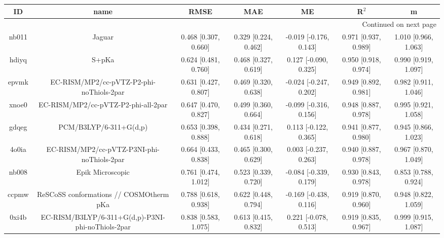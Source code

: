 \documentclass{article}
\begin{document}
\begin{center}
\begin{longtable}{|ccccccc|}
\toprule
    ID &                                               name &                  RMSE &                   MAE &                       ME &                 R$^2$ &                      m \\
\midrule
\endhead
\midrule
\multicolumn{7}{r}{{Continued on next page}} \\
\midrule
\endfoot

\bottomrule
\endlastfoot
 nb011 &                                             Jaguar &  0.468 [0.307, 0.660] &  0.329 [0.224, 0.462] &   -0.019 [-0.176, 0.143] &  0.971 [0.937, 0.989] &   1.010 [0.966, 1.063] \\
 hdiyq &                                              S+pKa &  0.624 [0.481, 0.760] &  0.468 [0.327, 0.619] &    0.127 [-0.090, 0.325] &  0.950 [0.918, 0.974] &   0.990 [0.919, 1.097] \\
 epvmk &           EC-RISM/MP2/cc-pVTZ-P2-phi-noThiols-2par &  0.631 [0.427, 0.807] &  0.469 [0.320, 0.638] &   -0.024 [-0.247, 0.202] &  0.949 [0.892, 0.981] &   0.982 [0.911, 1.046] \\
 xnoe0 &                EC-RISM/MP2/cc-pVTZ-P2-phi-all-2par &  0.647 [0.470, 0.827] &  0.499 [0.360, 0.664] &   -0.099 [-0.316, 0.156] &  0.948 [0.887, 0.978] &   0.995 [0.921, 1.058] \\
 gdqeg &                             PCM/B3LYP/6-311+G(d,p) &  0.653 [0.398, 0.888] &  0.434 [0.271, 0.618] &    0.113 [-0.122, 0.365] &  0.941 [0.877, 0.980] &   0.945 [0.866, 1.023] \\
 4o0ia &         EC-RISM/MP2/cc-pVTZ-P3NI-phi-noThiols-2par &  0.664 [0.433, 0.838] &  0.465 [0.300, 0.629] &    0.003 [-0.237, 0.263] &  0.940 [0.887, 0.978] &   0.967 [0.870, 1.049] \\
 nb008 &                                   Epik Microscopic &  0.761 [0.474, 1.012] &  0.523 [0.339, 0.720] &   -0.084 [-0.339, 0.179] &  0.930 [0.843, 0.978] &   0.853 [0.788, 0.924] \\
 ccpmw &            ReSCoSS conformations // COSMOtherm pKa &  0.788 [0.618, 0.938] &  0.622 [0.448, 0.794] &   -0.169 [-0.438, 0.116] &  0.919 [0.870, 0.960] &   0.948 [0.822, 1.059] \\
 0xi4b &  EC-RISM/B3LYP/6-311+G(d,p)-P3NI-phi-noThiols-2par &  0.838 [0.583, 1.075] &  0.613 [0.415, 0.832] &    0.221 [-0.078, 0.513] &  0.919 [0.835, 0.967] &   0.999 [0.915, 1.087] \\

\end{longtable}
\end{center}
\end{document}
